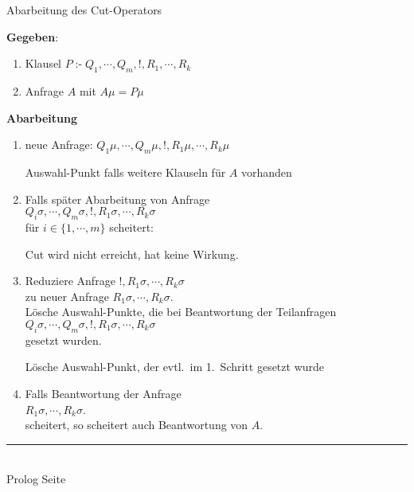 \documentclass{slides}
\newcommand{\myrule}{\rule{20cm}{1mm}\\ }
\newcounter{mypage}
\begin{document}
\begin{slide}{}
\normalsize
\begin{center}
Abarbeitung des Cut-Operators
\end{center}
\vspace{0.5cm}

\footnotesize
\textbf{Gegeben}: 
\begin{enumerate}
\item Klausel $P \;\texttt{:-}\; Q_1, \cdots, Q_m, \texttt{!}, R_1, \cdots, R_k$ 
\item Anfrage $A$ mit $A\mu = P\mu$
\end{enumerate}
\textbf{Abarbeitung}
\begin{enumerate}
\item neue Anfrage:  $Q_1\mu, \cdots, Q_m\mu, \texttt{!}, R_1\mu, \cdots, R_k\mu$ 

      Auswahl-Punkt falls weitere Klauseln für $A$ vorhanden
\item Falls später Abarbeitung von Anfrage  \\[0.3cm]
      \hspace*{1.3cm} 
      $Q_i\sigma, \cdots, Q_m\sigma, \texttt{!}, R_1\sigma, \cdots, R_k\sigma$ \\[0.3cm]
      für  $i\in\{1,\cdots,m\}$ scheitert:

       Cut wird nicht erreicht, hat keine Wirkung.
\item Reduziere Anfrage $\texttt{!}, R_1\sigma, \cdots, R_k\sigma$ \\[0.3cm]
      zu neuer Anfrage $R_1\sigma, \cdots, R_k\sigma$. \\[0.3cm]
      Lösche  Auswahl-Punkte, die bei Beantwortung der Teilanfragen \\[0.1cm]
      \hspace*{1.3cm} $Q_i\sigma, \cdots, Q_m\sigma, \texttt{!}, R_1\sigma, \cdots, R_k\sigma$ \\[0.3cm]
      gesetzt wurden.

      Lösche Auswahl-Punkt, der evtl.~im 1.~Schritt gesetzt wurde
\item Falls  Beantwortung der Anfrage \\[0.3cm]
      \hspace*{1.3cm} $R_1\sigma, \cdots, R_k\sigma$. \\[0.3cm]
      scheitert, so scheitert auch Beantwortung von  $A$.
\end{enumerate}

\vspace*{\fill}
\tiny \addtocounter{mypage}{1}
\myrule
Prolog  \hspace*{\fill} Seite 
\end{slide}
\end{document}

